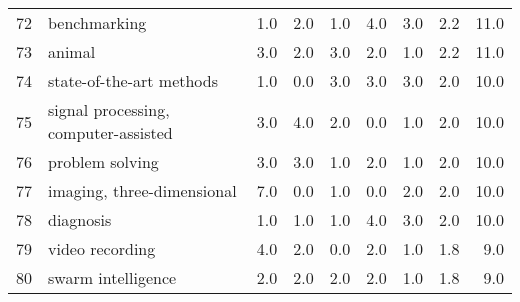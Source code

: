 \begin{tabular}{llrrrrrrr}
72 &                             benchmarking &   1.0 &   2.0 &   1.0 &   4.0 &   3.0 &   2.2 &   11.0 \\
73 &                                   animal &   3.0 &   2.0 &   3.0 &   2.0 &   1.0 &   2.2 &   11.0 \\
74 &                 state-of-the-art methods &   1.0 &   0.0 &   3.0 &   3.0 &   3.0 &   2.0 &   10.0 \\
75 &     signal processing, computer-assisted &   3.0 &   4.0 &   2.0 &   0.0 &   1.0 &   2.0 &   10.0 \\
76 &                          problem solving &   3.0 &   3.0 &   1.0 &   2.0 &   1.0 &   2.0 &   10.0 \\
77 &               imaging, three-dimensional &   7.0 &   0.0 &   1.0 &   0.0 &   2.0 &   2.0 &   10.0 \\
78 &                                diagnosis &   1.0 &   1.0 &   1.0 &   4.0 &   3.0 &   2.0 &   10.0 \\
79 &                          video recording &   4.0 &   2.0 &   0.0 &   2.0 &   1.0 &   1.8 &    9.0 \\
80 &                       swarm intelligence &   2.0 &   2.0 &   2.0 &   2.0 &   1.0 &   1.8 &    9.0 \\
\bottomrule
\end{tabular}
